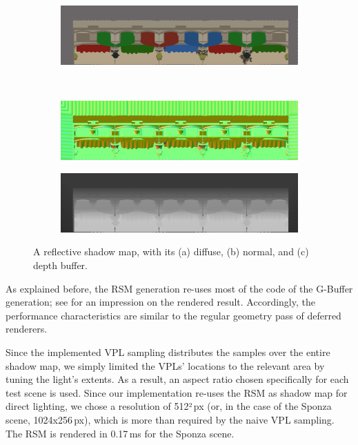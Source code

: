 \begin{figure}[htb]
    \centering
    \begin{subfigure}[b]{1.0\textwidth}
        \centering
        \includegraphics[width=1.0\linewidth]{screenshots/RSM_diffuse}%
        \caption{}
    \end{subfigure}\\
    \par\medskip
    \begin{subfigure}[b]{0.49\textwidth}
        \centering
        \includegraphics[width=1.0\linewidth]{screenshots/RSM_normal}%
        \caption{}
    \end{subfigure}%
    \hfill
    \begin{subfigure}[b]{0.49\textwidth}
        \centering
        \includegraphics[width=1.0\linewidth]{screenshots/RSM_depth}%
        \caption{}
    \end{subfigure}%
    \caption{A reflective shadow map, with its (a) diffuse, (b) normal, and (c) depth buffer.}
    \label{fig:results:RSMBuffers}%
\end{figure}%


As explained before, the RSM generation re-uses most of the code of the G-Buffer generation; see  for an impression on the rendered result. Accordingly, the performance characteristics are similar to the regular geometry pass of deferred renderers.

Since the implemented VPL sampling distributes the samples over the entire shadow map, we simply limited the VPLs' locations to the relevant area by tuning the light's extents. As a result, an aspect ratio chosen specifically for each test scene is used. Since our implementation re-uses the RSM as shadow map for direct lighting, we chose a resolution of 512²\,px (or, in the case of the Sponza scene, 1024x256\,px), which is more than required by the naive VPL sampling. The RSM is rendered in 0.17\,ms for the Sponza scene.

